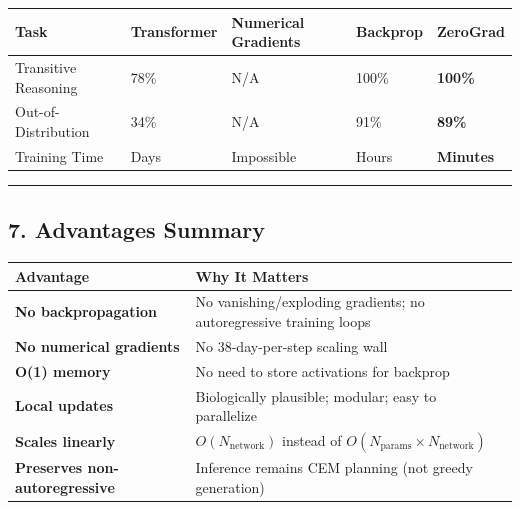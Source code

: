 \documentclass[
  11pt,
  a4paper,
]{article}
\begin{document}
\begin{longtable}[]{@{}lllll@{}}
\toprule\noalign{}
Task & Transformer & Numerical Gradients & Backprop &
\textbf{ZeroGrad} \\
\midrule\noalign{}
\endhead
\bottomrule\noalign{}
\endlastfoot
Transitive Reasoning & 78\% & N/A & 100\% & \textbf{100\%} \\
Out-of-Distribution & 34\% & N/A & 91\% & \textbf{89\%} \\
Training Time & Days & Impossible & Hours & \textbf{Minutes} \\
\end{longtable}

\begin{center}\rule{0.5\linewidth}{0.5pt}\end{center}

\subsection{7. Advantages Summary}\label{advantages-summary}

\begin{longtable}[]{@{}
  >{\raggedright\arraybackslash}p{}
  >{\raggedright\arraybackslash}p{}
  >{\raggedright\arraybackslash}p{}@{}}
\toprule\noalign{}
\begin{minipage}[b]{\linewidth}\raggedright
Advantage
\end{minipage} & \begin{minipage}[b]{\linewidth}\raggedright
Why It Matters
\end{minipage} & \begin{minipage}[b]{\linewidth}\raggedright
\end{minipage} \\
\midrule\noalign{}
\endhead
\bottomrule\noalign{}
\endlastfoot
\textbf{No backpropagation} & No vanishing/exploding gradients; no
autoregressive training loops & \\
\textbf{No numerical gradients} & No 38-day-per-step scaling wall & \\
\textbf{O(1) memory} & No need to store activations for backprop & \\
\textbf{Local updates} & Biologically plausible; modular; easy to
parallelize & \\
\textbf{Scales linearly} & \(O(N_{\text{network}})\) instead of
\(O(N_{\text{params}} \times N_{\text{network}})\) & \\
\textbf{Preserves non-autoregressive} & Inference remains CEM planning
(not greedy generation) & \\
\end{longtable}
\end{document}
